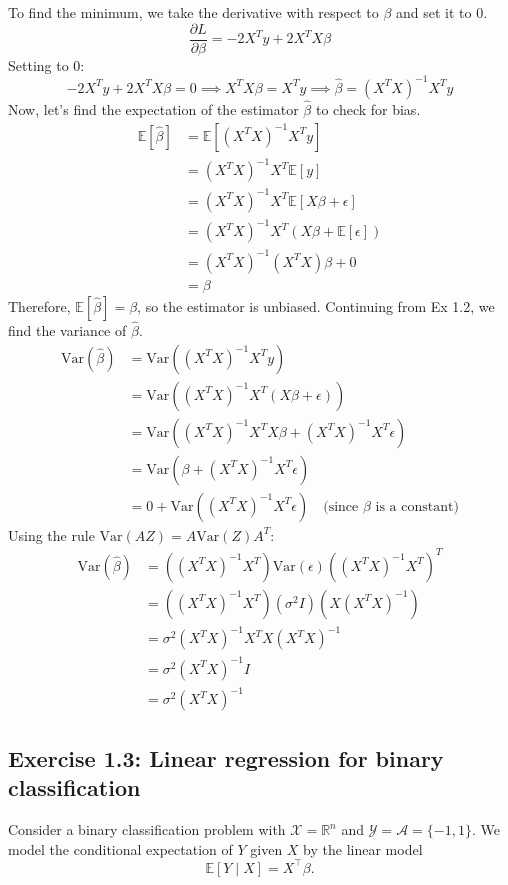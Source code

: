 To find the minimum, we take the derivative with respect to $\beta$ and set it to 0.
\[ \frac{\partial L}{\partial \beta} = -2X^T y + 2X^T X \beta \]
Setting to 0:
\[ -2X^T y + 2X^T X \beta = 0 \implies X^T X \beta = X^T y \implies \hat{\beta} = (X^T X)^{-1} X^T y \]
Now, let's find the expectation of the estimator $\hat{\beta}$ to check for bias.
\begin{align*}
    \mathbb{E}[\hat{\beta}] &= \mathbb{E}[(X^T X)^{-1} X^T y] \\
    &= (X^T X)^{-1} X^T \mathbb{E}[y] \\
    &= (X^T X)^{-1} X^T \mathbb{E}[X\beta + \epsilon] \\
    &= (X^T X)^{-1} X^T (X\beta + \mathbb{E}[\epsilon]) \\
    &= (X^T X)^{-1} (X^T X) \beta + 0 \\
    &= \beta
\end{align*}
Therefore, $\mathbb{E}[\hat{\beta}]=\beta$, so the estimator is unbiased. Continuing from Ex 1.2, we find the variance of $\hat{\beta}$.
\begin{align*}
    \text{Var}(\hat{\beta}) &= \text{Var}((X^T X)^{-1} X^T y) \\
    &= \text{Var}((X^T X)^{-1} X^T (X\beta + \epsilon)) \\
    &= \text{Var}((X^T X)^{-1} X^T X \beta + (X^T X)^{-1} X^T \epsilon) \\
    &= \text{Var}(\beta + (X^T X)^{-1} X^T \epsilon) \\
    &= 0 + \text{Var}((X^T X)^{-1} X^T \epsilon) \quad \text{(since } \beta \text{ is a constant)}
\end{align*}
Using the rule $\text{Var}(AZ) = A \text{Var}(Z) A^T$:
\begin{align*}
    \text{Var}(\hat{\beta}) &= ((X^T X)^{-1} X^T) \text{Var}(\epsilon) ((X^T X)^{-1} X^T)^T \\
    &= ((X^T X)^{-1} X^T) (\sigma^2 I) (X(X^T X)^{-1}) \\
    &= \sigma^2 (X^T X)^{-1} X^T X (X^T X)^{-1} \\
    &= \sigma^2 (X^T X)^{-1} I \\
    &= \sigma^2 (X^T X)^{-1}
\end{align*}

\subsection*{Exercise 1.3: Linear regression for binary classification}

Consider a binary classification problem with 
\(\mathcal{X} = \mathbb{R}^n\) and \(\mathcal{Y} = \mathcal{A} = \{-1, 1\}\). 
We model the conditional expectation of \(Y\) given \(X\) by the linear model
\[
\mathbb{E}[Y \mid X] = X^{\top}\beta.
\]

